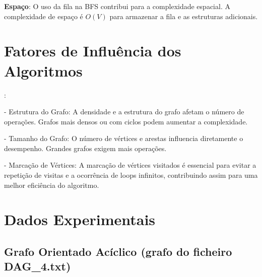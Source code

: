\documentclass{report}
\begin{document}
\hfill

\textbf{Espaço}: O uso da fila na BFS contribui para a complexidade espacial. A complexidade de espaço é \(O(V)\) para armazenar a fila e as estruturas adicionais.


\section{Fatores de Influência dos Algoritmos}:

- Estrutura do Grafo: A densidade e a estrutura do grafo afetam o número de operações. Grafos mais densos ou com ciclos podem aumentar a complexidade.

- Tamanho do Grafo: O número de vértices e arestas influencia diretamente o desempenho. Grandes grafos exigem mais operações.

- Marcação de Vértices: A marcação de vértices visitados é essencial para evitar a repetição de visitas e a ocorrência de loops infinitos, contribuindo assim para uma melhor eficiência do algoritmo.

\hfill

\section{Dados Experimentais}

\subsection{Grafo Orientado Acíclico (grafo do ficheiro DAG\_4.txt)}
\end{document}
